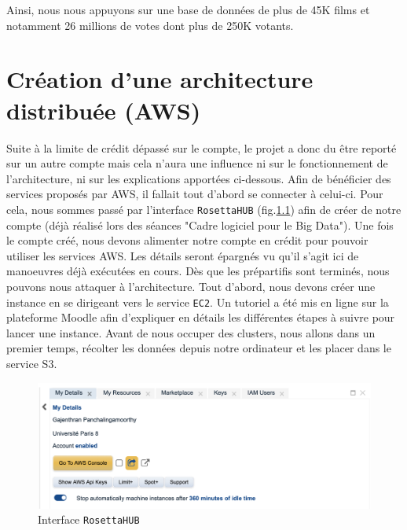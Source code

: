 \documentclass[a4paper, 12pt, oneside]{book}
\begin{document}
Ainsi, nous nous appuyons sur une base de données de plus de 45K films et notamment 26 millions de votes dont plus de 250K votants.

\chapter[AWS]{Création d'une architecture distribuée (AWS)}
Suite à la limite de crédit dépassé sur le compte, le projet a donc du être reporté sur un autre compte mais cela n'aura une influence ni sur le fonctionnement de l'architecture, ni sur les explications apportées ci-dessous.
\newline 
Afin de bénéficier des services proposés par AWS, il fallait tout d'abord se connecter à celui-ci. Pour cela, nous sommes passé par l'interface \texttt{RosettaHUB} (fig.\ref{fig:rosettahub}) afin de créer de notre compte (déjà réalisé lors des séances "Cadre logiciel pour le Big Data"). Une fois le compte créé, nous devons alimenter notre compte en crédit pour pouvoir utiliser les services AWS. Les détails seront épargnés vu qu'il s'agit ici de manoeuvres déjà exécutées en cours.
\newline
Dès que les prépartifis sont terminés, nous pouvons nous attaquer à l'architecture. Tout d'abord, nous devons créer une instance en se dirigeant vers le service \texttt{EC2}. Un tutoriel a été mis en ligne sur la plateforme Moodle afin d'expliquer en détails les différentes étapes à suivre pour lancer une instance. 
\newline
Avant de nous occuper des clusters, nous allons dans un premier temps, récolter les données depuis notre ordinateur et les placer dans le service S3. 

\begin{figure}[H]
  \centering
  \includegraphics[width=1.0\textwidth]{images/rosettahub}
  \caption{Interface \texttt{RosettaHUB}}
  \label{fig:rosettahub}
\end{figure}
\end{document}
